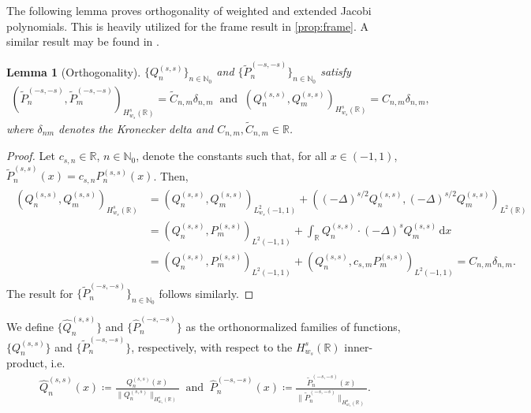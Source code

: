 \documentclass[10pt,a4paper]{article}
\newcommand{\dx}{\mathrm{d}x}
\newcommand{\eP}{\tilde{P}}
\newtheorem{lemma}{Lemma}[section]
\numberwithin{equation}{section}
\begin{document}
The following lemma proves orthogonality of weighted and extended Jacobi polynomials. This is heavily utilized for the frame result in \cref{prop:frame}. A similar result may be found in \cite[Prop.~3.6]{Papadopoulos2022e}. 
\begin{lemma}[Orthogonality]
\label{lem:orthogonality}
$\{ Q_n^{(s,s)} \}_{n \in \mathbb{N}_0}$ and $\{ \tilde{P}_n^{(-s,-s)} \}_{n \in \mathbb{N}_0}$ satisfy
\begin{align}
( \tilde{P}_n^{(-s,-s)}, \tilde{P}_m^{(-s,-s)} )_{H^s_{w_s}(\mathbb{R})}  = \tilde{C}_{n,m} \delta_{n,m} \;\;\text{and} \;\;
( Q_n^{(s,s)}, Q_m^{(s,s)} )_{H^s_{w_s}(\mathbb{R})}  = C_{n,m} \delta_{n,m},
\end{align}
where $\delta_{nm}$ denotes the Kronecker delta and $C_{n,m}, \tilde{C}_{n,m} \in \mathbb{R}$. 
\end{lemma}
\begin{proof}
Let  $c_{s,n} \in \mathbb{R}$, $n \in \mathbb{N}_0$, denote the constants such that, for all $x \in (-1,1)$, $\eP_n^{(s,s)}(x) = c_{s,n} P_n^{(s,s)}(x)$. Then,
\begin{align}
\begin{split}
( Q_n^{(s,s)}, Q_m^{(s,s)} )_{H^s_{w_s}(\mathbb{R})}
& =  ( Q_n^{(s,s)}, Q_m^{(s,s)} )_{L^2_{w_s}(-1,1)}+ ( (-\Delta)^{s/2} Q_n^{(s,s)}, (-\Delta)^{s/2} Q_m^{(s,s)} )_{L^2(\mathbb{R})} \\
& = ( Q_n^{(s,s)}, {P}_m^{(s,s)} )_{L^2(-1,1)}+ \int_{\mathbb{R}}  Q_n^{(s,s)} \cdot (-\Delta)^{s} Q_m^{(s,s)} \, \dx \\
&  = ( Q_n^{(s,s)}, {P}_m^{(s,s)} )_{L^2(-1,1)} + ( Q_n^{(s,s)}, c_{s,m} P_m^{(s,s)} )_{L^2(-1,1)} = {C}_{n,m} \delta_{n,m}.
\end{split}
\end{align}
The result for $\{ \eP_n^{(-s,-s)} \}_{n \in \mathbb{N}_0}$ follows similarly.
\end{proof}


We define $\{\hat{Q}_n^{(s,s)}\}$ and $\{\hat{P}_n^{(-s,-s)}\}$ as the orthonormalized families of functions, $\{Q_n^{(s,s)}\}$ and $\{\eP_n^{(-s,-s)}\}$, respectively, with respect to the $H^s_{w_s}(\mathbb{R})$ inner-product, i.e.
\begin{align}
\hat{Q}_n^{(s,s)}(x) \coloneqq \frac{{Q}_n^{(s,s)}(x)}{\| {Q}^{(s,s)}_n \|_{H^s_{w_s}(\mathbb{R})}} \;\;
\text{and} \;\;
\hat{P}_n^{(-s,-s)}(x) \coloneqq \frac{\tilde{P}_n^{(-s,-s)}(x)}{\| \tilde{P}^{(-s,-s)}_n \|_{H^s_{w_s}(\mathbb{R})}}.
\end{align}
\end{document}
